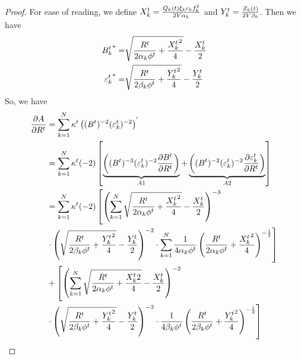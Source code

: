 \documentclass[conference]{IEEEtran}
\newtheorem{proof}{Proof}
\begin{document}
\begin{proof}
    For ease of reading, we define $X_k^t = {Q_k(t)\xi_kc_kf_k^2 \over 2V\alpha_k}$ and $Y_k^t = {Z_k(t) \over 2V\beta_k}$. Then we have
    \begin{alignat}{2}
        {B_k^t}^* = & \sqrt{{{R^t \over 2\alpha_k\phi^t} + \frac{{X_k^t}^2}{4}}} - \frac{X_k^t}{2} \\
        {\varepsilon_k^t}^* = & \sqrt{{R^t \over 2\beta_k\phi^t} + \frac{{Y_k^t}^2}{4}} - \frac{Y_k^t}{2}
    \end{alignat}
    So, we have
    \begin{alignat}{2}
        {\partial{A} \over \partial{R^t}}
        & = \sum_{k=1}^{N}\kappa^t\left((B^t)^{-2}(\varepsilon_k^t)^{-2}\right)^{'} \nonumber \\
        & = \sum_{k=1}^{N}\kappa^t(-2)\left[\underbrace{\left((B^t)^{-3}(\varepsilon_k^t)^{-2}\frac{\partial B^t}{\partial R^t}\right)}_{A1} + \underbrace{\left((B^t)^{-2}(\varepsilon_k^t)^{-3}\frac{\partial \varepsilon_k^t}{\partial R^t}\right)}_{A2}\right] \nonumber \\
        & = \sum_{k=1}^{N}\kappa^t(-2)\left[\left(\sum_{k=1}^{N}\sqrt{{R^t \over 2\alpha_k\phi^t} + {{X_k^t}^2 \over 4}} - {X_k^t \over 2}\right)^{-3} \right. \nonumber \\
        & \left. \cdot \left(\sqrt{{R^t \over 2\beta_k\phi^t} + {{Y_k^t}^2 \over 4}} - {Y_k^t \over 2}\right)^{-2} \cdot \sum_{k=1}^{N} {1 \over 4\alpha_k\phi^t}\left({R^t \over 2\alpha_k\phi^t} + {{X_k^t}^2 \over 4}\right)^{-\frac{1}{2}}\right] \nonumber \\
        & + \left[\left(\sum_{k=1}^{N}\sqrt{{R^t \over 2\alpha_k\phi^t} + {{X_k^t}2 \over 4}} - {X_k^t \over 2}\right)^{-2} \right. \nonumber \\
        & \left. \cdot \left(\sqrt{{R^t \over 2\beta_k\phi^t} + {{Y_k^t}^2 \over 4}} - {Y_k^t \over 2}\right)^{-3} \cdot {1 \over 4\beta_k\phi^t}\left({R^t \over 2\beta_k\phi^t} + {{Y_k^t}^2 \over 4}\right)^{-\frac{1}{2}} \right] \\


\end{alignat}
\end{proof}
\end{document}
